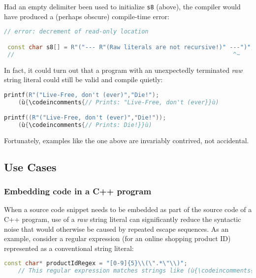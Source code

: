 \noindent Had an empty delimiter been used to initialize \texttt{s8} (above), the
compiler would have produced a (perhaps obscure) compile-time error:

\begin{lstlisting}[language=C++]
 // error: decrement of read-only location

 const char s8[] = R"("--- R"(Raw literals are not recursive!)" ---")";
 //                                                              ^~
\end{lstlisting}
    
\noindent In fact, it could turn out that a program with an unexpectedly
terminated \emph{raw} string literal could still be valid and compile
quietly:

\begin{lstlisting}[language=C++]
printf(R"("Live-Free, don't (ever)","Die!");
    (ù{\codeincomments{// Prints: "Live-Free, don't (ever}}ù)

printf((R"("Live-Free, don't (ever)","Die!"));
    (ù{\codeincomments{// Prints: Die!}}ù)
\end{lstlisting}
    
\noindent Fortunately, examples like the one above are invariably contrived, not
accidental.

\subsection[Use Cases]{Use Cases}\label{use-cases}

\subsubsection[Embedding code in a C++ program]{Embedding code in a C++ program}\label{embedding-code-in-a-c++-program}

When a source code snippet needs to be embedded as part of the source
code of a C++ program, use of a \emph{raw} string literal can
significantly reduce the syntactic noise that would otherwise be caused
by repeated escape sequences. As an example, consider a regular
expression (for an online shopping product ID) represented as a
conventional string literal:

\begin{lstlisting}[language=C++]
const char* productIdRegex = "[0-9]{5}\\(\".*\"\\)";
    // This regular expression matches strings like (ù{\codeincomments{12345("Product")}}ù).
\end{lstlisting}
    
